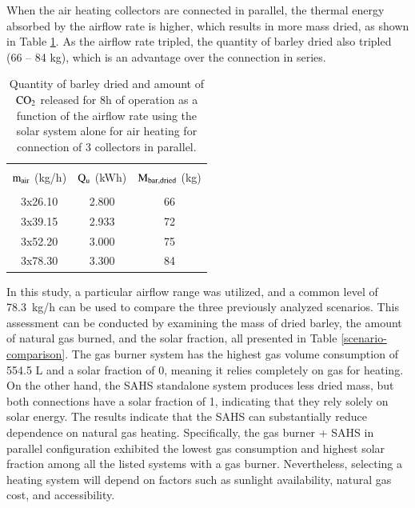 When the air heating collectors are connected in parallel, the thermal energy absorbed by the airflow rate is higher, which results in more mass dried, as shown in Table \ref{gas-only-parallel}. As the airflow rate tripled, the quantity of barley dried also tripled (66 -- 84 kg), which is an advantage over the connection in series.

\begin{table}[h]
	\caption{Quantity of barley dried and amount of $\rm{CO_2}$ released for 8h of operation as a function of the airflow rate using the solar system alone for air heating for connection of 3 collectors in parallel.}
	\centering
	
	\begin{tabular}{ccc}
		\hline \\ [-10pt]
		$\rm{m_{air}}$ (kg/h) & $\rm{Q_{u}}$ (kWh) & $\rm{M_{bar,dried}}$ (kg) \\
		\hline \\ [-10pt]
		3x26.10 & 2.800 & 66 \\ [2pt]
		3x39.15 & 2.933 & 72 \\ [2pt]
		3x52.20 & 3.000 & 75 \\ [2pt]
		3x78.30 & 3.300 & 84 \\ 
		\hline
	\end{tabular}
	
	\label{gas-only-parallel}
\end{table}


In this study, a particular airflow range was utilized, and a common level of 78.3~kg/h can be used to compare the three previously analyzed scenarios. This assessment can be conducted by examining the mass of dried barley, the amount of natural gas burned, and the solar fraction, all presented in Table \ref{scenario-comparison}.  The gas burner system has the highest gas volume consumption of 554.5 L and a solar fraction of 0, meaning it relies completely on gas for heating. On the other hand, the SAHS standalone system produces less dried mass, but both connections have a solar fraction of 1, indicating that they rely solely on solar energy. The results indicate that the SAHS can substantially reduce dependence on natural gas heating. Specifically, the gas burner + SAHS in parallel configuration exhibited the lowest gas consumption and highest solar fraction among all the listed systems with a gas burner. Nevertheless, selecting a heating system will depend on factors such as sunlight availability, natural gas cost, and accessibility.

